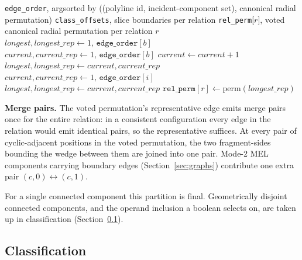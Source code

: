 \documentclass{egpubl}
\begin{document}
\begin{algorithm}[t]
\caption{Per-relation canonical-permutation vote}
\label{alg:vote}
\begin{algorithmic}[1]
\Require \texttt{edge\_order}, argsorted by ((polyline id, incident-component set), canonical radial permutation)
\Require \texttt{class\_offsets}, slice boundaries per relation
\Ensure \texttt{rel\_perm}[$r$], voted canonical radial permutation per relation $r$
\For{each class slice $[b, e)$ in \texttt{class\_offsets} \textbf{in parallel}}
  \State $\textit{longest}, \textit{longest\_rep} \gets 1,\, \texttt{edge\_order}[b]$
  \State $\textit{current}, \textit{current\_rep} \gets 1,\, \texttt{edge\_order}[b]$
  \For{$i \in [b+1, e)$}
      \State $\textit{current} \gets \textit{current} + 1$
    \Else
        \State $\textit{longest}, \textit{longest\_rep} \gets \textit{current}, \textit{current\_rep}$
      \EndIf
      \State $\textit{current}, \textit{current\_rep} \gets 1,\, \texttt{edge\_order}[i]$
    \EndIf
  \EndFor
    \State $\textit{longest}, \textit{longest\_rep} \gets \textit{current}, \textit{current\_rep}$
  \EndIf
  \State $\texttt{rel\_perm}[r] \gets \textrm{perm}(\textit{longest\_rep})$
\EndFor
\end{algorithmic}
\end{algorithm}

\textbf{Merge pairs.} The voted permutation's representative edge emits merge pairs once for the entire relation: in a consistent configuration every edge in the relation would emit identical pairs, so the representative suffices. At every pair of cyclic-adjacent positions in the voted permutation, the two fragment-sides bounding the wedge between them are joined into one pair. Mode-2 MEL components carrying boundary edges (Section~\ref{sec:graphs}) contribute one extra pair $(c, 0) \leftrightarrow (c, 1)$.

For a single connected component this partition is final. Geometrically disjoint connected components, and the operand inclusion a boolean selects on, are taken up in classification (Section~\ref{sec:classification}).

\subsection{Classification}
\label{sec:classification}
\end{document}
